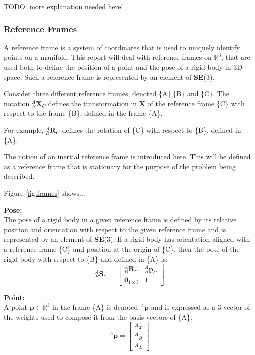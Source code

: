		TODO: more explanation needed here!
		
	\subsubsection{Reference Frames}
		A reference frame is a system of coordinates that is used to uniquely identify points on a manifold. This report will deal with reference frames on $\mathbb{R}^3$, that are used both to define the position of a point and the pose of a rigid body in 3D space.
		Such a reference frame is represented by an element of \textbf{SE}(3).
		
		Consider three different reference frames, denoted \{A\},\{B\} and \{C\}.
		The notation $^{A}_{B}\mathbf{X}^{}_{C}$ defines the transformation in $\mathbf{X}$ of the reference frame \{C\} with respect to the frame \{B\}, defined in the frame \{A\}.
		
		For example, $^{A}_{B}\mathbf{R}^{}_{C}$ defines the rotation of \{C\} with respect to \{B\}, defined in \{A\}.
		
		The notion of an inertial reference frame is introduced here. This will be defined as a reference frame that is stationary for the purpose of the problem being described. 
		
		Figure \ref{fig:frames} shows...
		
		
		\textbf{Pose:}\\
		The pose of a rigid body in a given reference frame is defined by its relative position and orientation with respect to the given reference frame and is represented by an element of \textbf{SE}(3). If a rigid body has orientation aligned with a reference frame \{C\} and position at the origin of \{C\}, then the pose of the rigid body with respect to \{B\} and defined in \{A\} is:
		\begin{equation}
			{^{A}_{B}\mathbf{S}^{}_{C}} = 
			\begin{bmatrix}
				^{A}_{B}\mathbf{R}^{}_{C}	& 	^{A}_{B}\mathbf{p}^{}_{C}\\
				\textbf{0}_{1 \times 3} & 1						  
			\end{bmatrix}
		\end{equation}		
		
		\textbf{Point:}\\
		A point $\mathbf{p} \in \mathbb{R}^3$ in the frame \{A\} is denoted $^A\mathbf{p}$ and is expressed as a 3-vector of the weights used to compose it from the basis vectors of \{A\}.
		\begin{equation}
			^{A}\mathbf{p} = 
			\begin{bmatrix}
				^{A}x \\
				^{A}y \\
				^{A}z
			\end{bmatrix}
		\end{equation}
		
